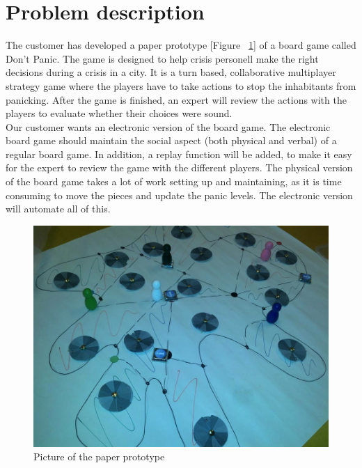 \section{Problem description} 

The customer has developed a paper prototype [Figure ~\ref{fig:paperPrototype}] 
of a board game called Don’t Panic. The game is designed to help crisis personell 
make the right decisions during a crisis in a city. It is a turn based, 
collaborative multiplayer strategy game where the players have to take actions to stop the 
inhabitants from panicking. After the game is finished, an expert will review 
the actions with the players to evaluate whether their choices were sound. 
\\
Our customer wants an electronic version of the board game. The electronic 
board game should maintain the social aspect (both physical and verbal) of a 
regular board game. In addition, a replay function will be added, to make it 
easy for the expert to review the game with the different players. The 
physical version of the board game takes a lot of work setting up and 
maintaining, as it is time consuming to move the pieces and update the panic 
levels. The electronic version will automate all of this.
\\

\begin{figure}[H]
  \centering
    \includegraphics[width=1.0\textwidth]{img/paperprototype}
  \caption{Picture of the paper prototype} 
  \label{fig:paperPrototype}
\end{figure}


